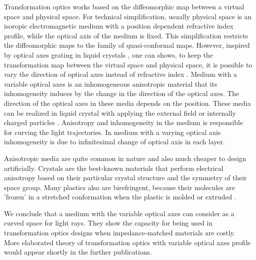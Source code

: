 \documentclass[9pt,twocolumn,twoside]{osajnl}
\begin{document}
Transformation optics works based on the diffeomorphic map between a virtual space and physical space. For technical simplification, usually physical space is an isoropic electromagnetic medium with a position dependent refractive index profile, while the optical axis of the medium is fixed. This simplification restricts the diffeomorphic maps to the family of quasi-conformal maps. 
However, inspired by optical axes grating in liquid crystals \cite{Sarkissian, NERSISYAN}, one can shows, to keep the transformation map between the virtual space and physical space, it is possible to vary the direction of optical axes instead of refractive index \cite{liang2012transformation}.  
Medium with a variable optical axes is an inhomogeneous anisotropic material that its inhomogeneity induces by the change in the direction of the optical axes. The direction of the optical axes in these media depends on the position.
These media can be realized in liquid crystal with applying the external field or internally charged particles \cite{sluijter2010ray}.
Anisotropy and inhomogeneity in the medium is responsible for curving the light trajectories. In medium with a varying optical axis inhomogeneity is due to infinitesimal change of optical axis in each layer. 

Anisotropic media are quite common in nature and also much cheaper to design artificially. Crystals are the best-known materials that perform electrical anisotropy based on their particular crystal structure and the symmetry of their space group. Many plastics also are birefringent, because their molecules are 'frozen' in a stretched conformation when the plastic is molded or extruded \cite{PEN}. 
 
 We conclude that a medium with the variable optical axes can consider as a curved space for light rays. They show the capacity for being used in transformation optics designs when impedance-matched materials are costly. More elaborated theory of transformation optics with variable optical axes profile would appear shortly in the further publications.
\end{document}
